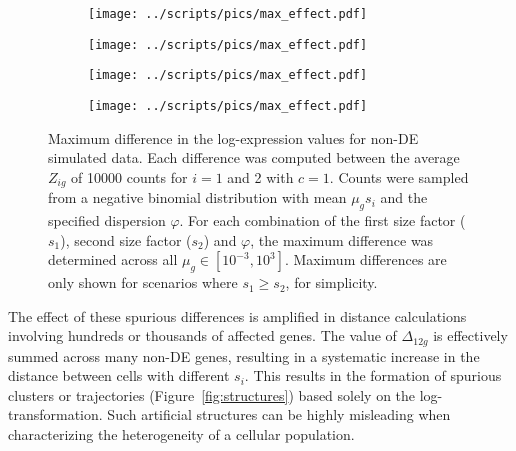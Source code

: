 \documentclass[10pt,letterpaper]{article}
\begin{document}
\begin{figure}[btp]
\centering
\begin{subfigure}[b]{0.49\textwidth}
    \texttt{[image: ../scripts/pics/max\_effect.pdf]}
    \caption{}
\end{subfigure}
\begin{subfigure}[b]{0.49\textwidth}
    \texttt{[image: ../scripts/pics/max\_effect.pdf]}
    \caption{}
\end{subfigure}
\begin{subfigure}[b]{0.49\textwidth}
    \texttt{[image: ../scripts/pics/max\_effect.pdf]}
    \caption{}
\end{subfigure}
\begin{subfigure}[b]{0.49\textwidth}
    \texttt{[image: ../scripts/pics/max\_effect.pdf]}
    \caption{}
\end{subfigure}
\caption{Maximum difference in the log-expression values for non-DE simulated data.
Each difference was computed between the average $Z_{ig}$ of 10000 counts for $i=1$ and 2 with $c=1$.
Counts were sampled from a negative binomial distribution with mean $\mu_g s_i$ and the specified dispersion $\varphi$.
For each combination of the first size factor ($s_1$), second size factor ($s_2$) and $\varphi$, the maximum difference was determined across all $\mu_g \in [10^{-3}, 10^3]$.
Maximum differences are only shown for scenarios where $s_1 \ge s_2$, for simplicity.
}
\label{fig:maxeffect}
\end{figure}

The effect of these spurious differences is amplified in distance calculations involving hundreds or thousands of affected genes.
The value of $\Delta_{12g}$ is effectively summed across many non-DE genes, resulting in a systematic increase in the distance between cells with different $s_i$. 
This results in the formation of spurious clusters or trajectories (Figure~\ref{fig:structures}) based solely on the log-transformation.
Such artificial structures can be highly misleading when characterizing the heterogeneity of a cellular population.
\end{document}
